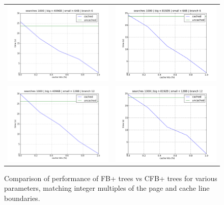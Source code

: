 \documentclass{article}
\begin{document}
\begin{figure}[p]
\begin{tabular}{l l}
\includegraphics[width=250pt]{4096_64_6} & \includegraphics[width=250pt]{8192_64_6} \\
\includegraphics[width=250pt]{4096_128_12} & \includegraphics[width=250pt]{8192_128_12} \\
\end{tabular}
\caption{
Comparison of performance of FB+ trees vs CFB+ trees for various parameters,
matching integer multiples of the page and cache line boundaries.
}
\label{fig:cachehits1}
\end{figure}
\end{document}
